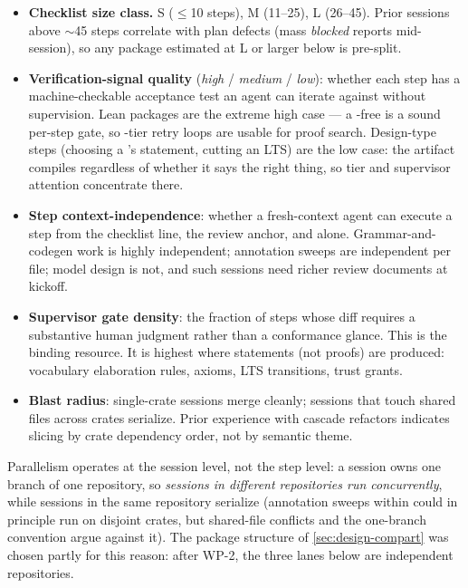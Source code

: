 \begin{itemize}[leftmargin=1.4em]
\item \textbf{Checklist size class.} S ($\le$10 steps), M (11--25),
  L (26--45). Prior sessions above $\sim$45 steps correlate with
  plan defects (mass \emph{blocked} reports mid-session), so any
  package estimated at L or larger below is pre-split.
\item \textbf{Verification-signal quality} (\emph{high} / \emph{medium}
  / \emph{low}): whether each step has a machine-checkable acceptance
  test an agent can iterate against without supervision. Lean packages
  are the extreme high case --- a -free 
  is a sound per-step gate, so -tier retry loops are
  usable for proof search. Design-type steps (choosing a
  's statement, cutting an LTS) are the low case: the
  artifact compiles regardless of whether it says the right thing,
  so tier and supervisor attention concentrate there.
\item \textbf{Step context-independence}: whether a fresh-context agent
  can execute a step from the checklist line, the review anchor, and
   alone. Grammar-and-codegen work is highly
  independent; annotation sweeps are independent per file; model
  design is not, and such sessions need richer review documents at
  kickoff.
\item \textbf{Supervisor gate density}: the fraction of steps whose
  diff requires a substantive human judgment rather than a
  conformance glance. This is the binding resource. It is highest
  where statements (not proofs) are produced: vocabulary elaboration
  rules, axioms, LTS transitions, trust grants.
\item \textbf{Blast radius}: single-crate sessions merge cleanly;
  sessions that touch shared files across crates serialize. Prior
  experience with cascade refactors indicates slicing by crate
  dependency order, not by semantic theme.
\end{itemize}

Parallelism operates at the session level, not the step level: a
session owns one branch of one repository, so \emph{sessions in
different repositories run concurrently}, while sessions in the same
repository serialize (annotation sweeps within \dotnetrs{} could in
principle run on disjoint crates, but shared-file conflicts and the
one-branch convention argue against it). The package structure of
\cref{sec:design-compart} was chosen partly for this reason: after
WP-2, the three lanes below are independent repositories.

